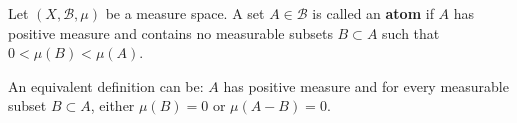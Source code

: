 \documentclass[12pt]{article}
\begin{document}
Let $(X, \mathcal{B},\mu)$ be a measure space. A set $A \in \mathcal{B}$ is called an {\bf atom} if $A$ has positive measure and contains no measurable subsets $B \subset A$ such that $0 < \mu (B)< \mu(A)$.
 
An equivalent definition can be: $A$ has positive measure and for every measurable subset $B \subset A$, either $\mu(B)=0$ or $\mu(A-B)=0$.
\end{document}
